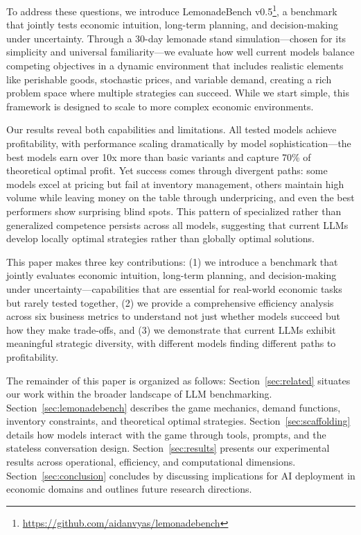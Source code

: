 \documentclass[11pt]{article}
\begin{document}
To address these questions, we introduce LemonadeBench v0.5\footnote{\url{https://github.com/aidanvyas/lemonadebench}}, a benchmark that jointly tests economic intuition, long-term planning, and decision-making under uncertainty.
Through a 30-day lemonade stand simulation—chosen for its simplicity and universal familiarity—we evaluate how well current models balance competing objectives in a dynamic environment that includes realistic elements like perishable goods, stochastic prices, and variable demand, creating a rich problem space where multiple strategies can succeed.
While we start simple, this framework is designed to scale to more complex economic environments.

Our results reveal both capabilities and limitations.
All tested models achieve profitability, with performance scaling dramatically by model sophistication—the best models earn over 10x more than basic variants and capture 70\% of theoretical optimal profit.
Yet success comes through divergent paths: some models excel at pricing but fail at inventory management, others maintain high volume while leaving money on the table through underpricing, and even the best performers show surprising blind spots.
This pattern of specialized rather than generalized competence persists across all models, suggesting that current LLMs develop locally optimal strategies rather than globally optimal solutions.

This paper makes three key contributions: (1) we introduce a benchmark that jointly evaluates economic intuition, long-term planning, and decision-making under uncertainty—capabilities that are essential for real-world economic tasks but rarely tested together, (2) we provide a comprehensive efficiency analysis across six business metrics to understand not just whether models succeed but how they make trade-offs, and (3) we demonstrate that current LLMs exhibit meaningful strategic diversity, with different models finding different paths to profitability.

The remainder of this paper is organized as follows: Section~\ref{sec:related} situates our work within the broader landscape of LLM benchmarking.
Section~\ref{sec:lemonadebench} describes the game mechanics, demand functions, inventory constraints, and theoretical optimal strategies.
Section~\ref{sec:scaffolding} details how models interact with the game through tools, prompts, and the stateless conversation design.
Section~\ref{sec:results} presents our experimental results across operational, efficiency, and computational dimensions.
Section~\ref{sec:conclusion} concludes by discussing implications for AI deployment in economic domains and outlines future research directions.
\end{document}
